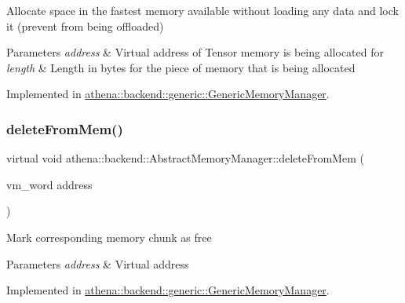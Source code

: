 Allocate space in the fastest memory available without loading any data and lock it (prevent from being offloaded) 
\begin{DoxyParams}{Parameters}
{\em address} & Virtual address of Tensor memory is being allocated for \\
\hline
{\em length} & Length in bytes for the piece of memory that is being allocated \\
\hline
\end{DoxyParams}


Implemented in \mbox{\hyperlink{classathena_1_1backend_1_1generic_1_1_generic_memory_manager_abe837ac5e3bb60c9bc24836788cae679}{athena\+::backend\+::generic\+::\+Generic\+Memory\+Manager}}.

\mbox{\label{classathena_1_1backend_1_1_abstract_memory_manager_a8ffd6cf21559978f394e2e11815506b5}} 
\subsubsection{\texorpdfstring{delete\+From\+Mem()}{deleteFromMem()}}
{\footnotesize\ttfamily virtual void athena\+::backend\+::\+Abstract\+Memory\+Manager\+::delete\+From\+Mem (\begin{DoxyParamCaption}\item[{vm\+\_\+word}]{address }\end{DoxyParamCaption})\hspace{0.3cm}{\ttfamily [pure virtual]}}

Mark corresponding memory chunk as free 
\begin{DoxyParams}{Parameters}
{\em address} & Virtual address \\
\hline
\end{DoxyParams}


Implemented in \mbox{\hyperlink{classathena_1_1backend_1_1generic_1_1_generic_memory_manager_a2767b6c1f5887a2928b665e0c1b454c7}{athena\+::backend\+::generic\+::\+Generic\+Memory\+Manager}}.

\mbox{\label{classathena_1_1backend_1_1_abstract_memory_manager_ad441d7a2281f5f2b2627272d136f72b8}} 
